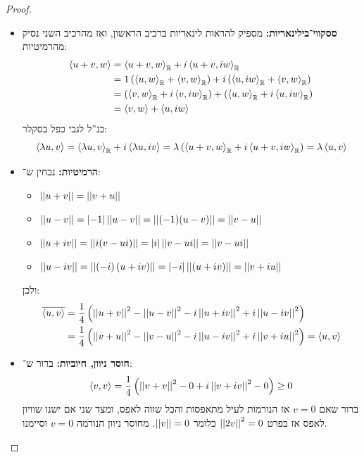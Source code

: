 \documentclass[]{../../../../../tex/classes/homework}
\renewcommand\mut[2] {\left \la #1, #2 \right \ra}
\begin{document}
\begin{enumerate}
\begin{proof}
			\begin{itemize}
				\item \textbf{ססקווי־בילינאריות: }מספיק להראות לינאריות ברכיב הראשון, ואז מהרכיב השני נסיק מהרמיטיות: 
				\begin{align*}
					\mut{u + v}{w} &= \mut{u + v}{w}_\R + i\mut{u + v}{iw}_\R \\
					&= 1\cl{\mut{u}{w}_\R + \mut{v}{w}_\R} + i\cl{\mut{u}{iw}_\R + \mut{v}{w}_\R} \\
					&= \cl{\mut{v}{w}_\R + i\mut{v}{iw}_\R} + \cl{\mut{u}{w}_\R + i\mut{u}{iw}_\R} \\
					&= \mut{v}{w} + \mut{u}{iw}
				\end{align*}
				כנ''ל לגבי כפל בסקלר: 
				\[ \mut{\lg u}{v} = \mut{\lg u}{v}_\R + i \mut{\lg u}{iv} = \lg \cl{\mut{u + v}{w}_\R + i\mut{u + v}{iw}_\R} = \lg \mut{u}{v} \]
				\item \textbf{הרמיטיות: }נבחין ש־: 
				\begin{itemize}
					\item \hfil $\norm{u + v} = \norm{v + u}$
					\item \hfil $\norm{u - v} = \sof{-1}\norm{u - v} = \norm{(-1)(u - v)} = \norm{v - u}$
					\item \hfil $\norm{u + iv} = \norm{i(v - ui)} = \sof{i}\norm{v - ui} = \norm{v - ui}$
					\item \hfil $\norm{u - iv} = \norm{\cl{-i}(u + iv)} = \sof{-i}\norm{(u + iv)} = \norm{v + iu}$
				\end{itemize}
				ולכן: 
				\begin{align*}
					\ol{\mut{u}{v}} &= \frac{1}{4}\cl{\norm{u + v}^{2} - \norm{u - v}^{2} - i\norm{u + iv}^{2} + i\norm{u - iv}^{2}} \\
					&= \frac{1}{4}\cl{\norm{v + u}^{2} - \norm{v - u}^{2} - i\norm{u - iv}^{2} + i\norm{v + iu}^{2}} = \mut{u}{v}
				\end{align*}
				\item \textbf{חוסר ניוון, חיוביות: }ברור ש־: 
				\[ \mut{v}{v} = \frac{1}{4}\cl{\norm{v + v}^{2} - 0 + i \norm{v + iv}^{2} - 0} \ge 0 \]
				ברור שאם $v = 0$ אז הנורמות לעיל מתאפסות והכל שווה לאפס, ומצד שני אם ישנו שוויון לאפס אז בפרט $\norm{2v}^{2} = 0$ כלומר $\norm v = 0$. מחוסר ניוון הנורמה $v = 0$ וסיימנו. 
			\end{itemize}\envendproof
		\end{proof}
	\end{enumerate}
	
\end{document}
